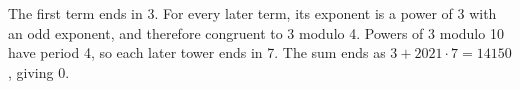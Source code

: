 The first term ends in 3. For every later term, its exponent is a power of 3 with an odd exponent, and therefore congruent to 3 modulo 4. Powers of 3 modulo 10 have period 4, so each later tower ends in 7. The sum ends as $3+2021\cdot7=14150$, giving $\boxed0$.
